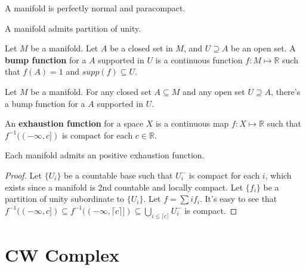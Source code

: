\documentclass[12pt]{book}
\begin{document}
\begin{corollary}
	A manifold is perfectly normal and paracompact.
\end{corollary}

\begin{corollary}
	A manifold admits partition of unity.
\end{corollary}

\begin{definition}
	Let $M$ be a manifold. Let $A$ be a closed set in $M$, and $U\supseteq A$ be an open set. A {\bf bump function} for a $A$ supported in $U$ is a continuous function $f:M\mapsto \mathbb R$ such that $f(A)=1$ and $supp(f)\subseteq U$.
\end{definition}

\begin{lemma}
	Let $M$ be a manifold. For any closed set $A\subseteq M$ and any open set $U\supseteq A$, there's a bump function for a $A$ supported in $U$.
\end{lemma}

\begin{definition}
	An {\bf exhaustion function} for a space $X$ is a continuous map $f:X\mapsto \mathbb R$ such that $f^{-1}((-\infty,c])$ is compact for each $c\in\mathbb R$.
\end{definition}

\begin{lemma}
	Each manifold admits an positive exhaustion function.
\end{lemma}
\begin{proof}
	Let $\{U_i\}$ be a countable base such that $U_i^-$ is compact for each $i$, which exists since a manifold is 2nd countable and locally compact. Let $\{f_i\}$ be a partition of unity subordinate to $\{U_i\}$. Let $f=\sum if_i$. It's easy to see that $f^{-1}((-\infty,c])\subseteq f^{-1}((-\infty,\lceil c\rceil])\subseteq\bigcup_{i\leq\lceil c\rceil}U_i^-$ is compact.
\end{proof}

\section{CW Complex}
\end{document}
